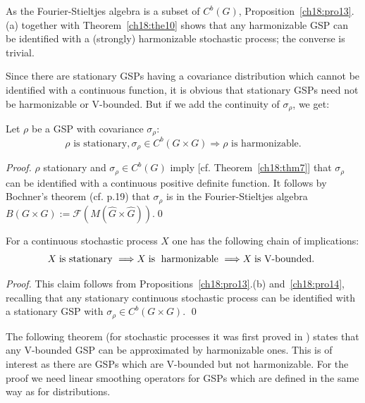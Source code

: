 \documentclass[graybox]{svmult}
\begin{document}
\begin{rem}
As the Fourier-Stieltjes algebra is a subset of $C^{b}(G)$, Proposition~\ref{ch18:pro13}.(a) together with Theorem~\ref{ch18:the10} shows that any harmonizable GSP can be
identified with a (strongly) harmonizable stochastic process; the
converse is trivial.
\end{rem}

Since there are stationary
GSPs having a covariance distribution which cannot be identified with a
continuous function, it is obvious that stationary GSPs need not be
harmonizable or V-bounded. But if we add the continuity of
${\sigma_{ \rho}}$, we get:
\begin{proposition}\label{ch18:pro14}
Let $\rho $ be a GSP with covariance ${\sigma_{ \rho}}$:
\[
\rho \text{ is  stationary}, {\sigma_{ \rho}} \in C^{b}(G\times G)
\Longrightarrow \rho \, \, \text{is  harmonizable}.
\]
\end{proposition}

\begin{proof}
$\rho $ stationary and ${\sigma_{ \rho}} \in
C^{b}(G)$ imply [cf. Theorem~\ref{ch18:thm7}] that ${\sigma_{ \rho}}$ can be identified
with a continuous positive definite function. It follows by Bochner's
theorem (cf.  \cite{ru62} p.19) that ${\sigma_{ \rho}}$ is in the
Fourier-Stieltjes algebra $B(G\times G) := \mathcal{F}(M(\hat{G}\times
\hat{G}))$.\qed
\end{proof}

\setcounter{corollary}{14}
\begin{corollary}\label{ch18:cor15}
For a continuous stochastic process $X$
one has the following chain of implications:
\[
X \; \text{is   stationary }\Longrightarrow  X\; \text{is\; harmonizable }
\Longrightarrow  X \; \text{is  V-bounded. }
\]
\end{corollary}

\begin{proof}
This claim follows from
Propositions~\ref{ch18:pro13}.(b) and~\ref{ch18:pro14}, recalling that any stationary
continuous stochastic process can be identified
with a stationary GSP with ${\sigma_{ \rho}} \in C^{b}(G\times G).$
\qed
\end{proof}

The following theorem (for stochastic processes it was first
proved in \cite{ni75}) states that any V-bounded GSP can be
approximated by harmonizable ones.  This is of interest as there are
GSPs which are V-bounded but not harmonizable.  For the proof we need
linear smoothing operators for GSPs which are defined in the same way as for distributions.
\end{document}
